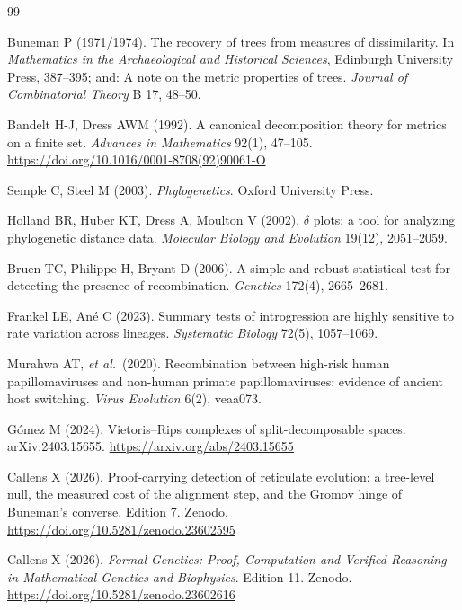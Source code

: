 \documentclass[11pt,a4paper]{article}
\theoremstyle{definition}
\theoremstyle{remark}
\begin{document}
\begin{thebibliography}{99}

 Buneman P (1971/1974). The recovery of trees from measures of
dissimilarity. In \emph{Mathematics in the Archaeological and Historical
Sciences}, Edinburgh University Press, 387--395; and: A note on the metric
properties of trees. \emph{Journal of Combinatorial Theory} B 17, 48--50.

 Bandelt H-J, Dress AWM (1992). A canonical decomposition
theory for metrics on a finite set. \emph{Advances in Mathematics} 92(1),
47--105. \url{https://doi.org/10.1016/0001-8708(92)90061-O}

 Semple C, Steel M (2003). \emph{Phylogenetics}. Oxford
University Press.

 Holland BR, Huber KT, Dress A, Moulton V (2002). $\delta$
plots: a tool for analyzing phylogenetic distance data. \emph{Molecular Biology
and Evolution} 19(12), 2051--2059.

 Bruen TC, Philippe H, Bryant D (2006). A simple and robust
statistical test for detecting the presence of recombination. \emph{Genetics}
172(4), 2665--2681.

 Frankel LE, An\'e C (2023). Summary tests of introgression
are highly sensitive to rate variation across lineages. \emph{Systematic
Biology} 72(5), 1057--1069.

 Murahwa AT, \emph{et al.}\ (2020). Recombination between
high-risk human papillomaviruses and non-human primate papillomaviruses:
evidence of ancient host switching. \emph{Virus Evolution} 6(2), veaa073.

 G\'omez M (2024). Vietoris--Rips complexes of split-decomposable
spaces. arXiv:2403.15655. \url{https://arxiv.org/abs/2403.15655}

 Callens X (2026). Proof-carrying detection of reticulate
evolution: a tree-level null, the measured cost of the alignment step, and the
Gromov hinge of Buneman's converse. Edition 7. Zenodo.
\url{https://doi.org/10.5281/zenodo.23602595}

 Callens X (2026). \emph{Formal Genetics: Proof, Computation
and Verified Reasoning in Mathematical Genetics and Biophysics}. Edition 11.
Zenodo. \url{https://doi.org/10.5281/zenodo.23602616}

\end{thebibliography}
\end{document}
